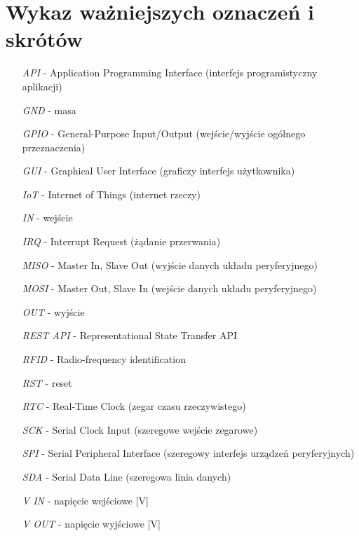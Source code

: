\section*{Wykaz ważniejszych oznaczeń i skrótów}


	\begin{itemize}
		\item[\textit{API}] - Application Programming Interface (interfejs programistyczny aplikacji)
		\item[\textit{GND}] - masa
		\item[\textit{GPIO}] - General-Purpose Input/Output (wejście/wyjście ogólnego przeznaczenia)
		\item[\textit{GUI}] - Graphical User Interface (graficzy interfejs użytkownika)
		\item[\textit{IoT}] - Internet of Things (internet rzeczy)
		\item[\textit{IN}] - wejście
		\item[\textit{IRQ}] - Interrupt Request (żądanie przerwania)
		\item[\textit{MISO}] - Master In, Slave Out (wyjście danych układu peryferyjnego)
		\item[\textit{MOSI}] - Master Out, Slave In (wejście danych układu peryferyjnego)
		\item[\textit{OUT}] - wyjście
		\item[\textit{REST API}] - Representational State Transfer API
		\item[\textit{RFID}] - Radio-frequency identification
		\item[\textit{RST}] - reset
		\item[\textit{RTC}] - Real-Time Clock (zegar czasu rzeczywistego)
		\item[\textit{SCK}] - Serial Clock Input (szeregowe wejście zegarowe)
		\item[\textit{SPI}] - Serial Peripheral Interface (szeregowy interfejs urządzeń peryferyjnych)
		\item[\textit{SDA}] - Serial Data Line (szeregowa linia danych)
		\item[\textit{V IN}] - napięcie wejściowe [V]
		\item[\textit{V OUT}] - napięcie wyjściowe [V]

	\end{itemize}



